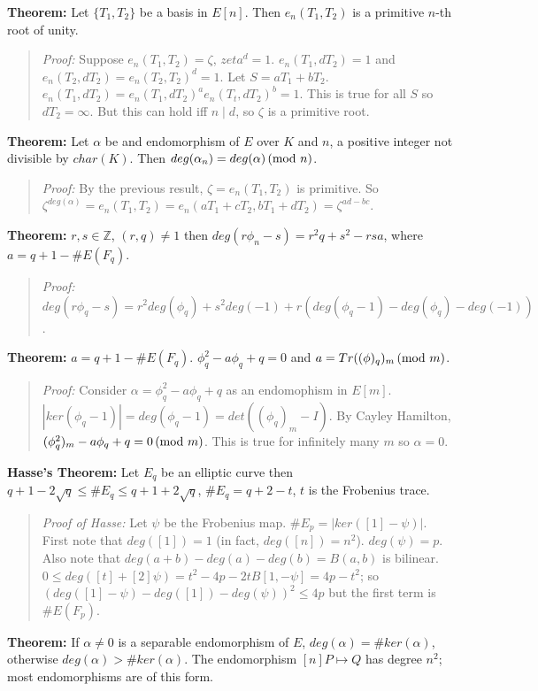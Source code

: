 {\bf Theorem:} Let $\{T_1 , T_2 \}$ be a basis in $E[n]$.  Then $e_n(T_1 , T_2 )$ is a primitive $n$-th
root of unity.
\begin{quote}
\emph{Proof:}  Suppose $e_n(T_1 , T_2 )= \zeta$, $zeta^d=1$.  $e_n(T_1, d T_2)=1$ and
$e_n(T_2, dT_2)= e_n(T_2 , T_2 )^d= 1$.  Let $S= a T_1 +b T_2$.  
$e_n(T_1, dT_2)= e_n(T_1 , dT_2)^a e_n(T_t, dT_2)^b=1$.  This is true for all $S$ so $dT_2= \infty$.  But
this can hold iff $n \mid d$, so $\zeta$ is  a primitive root.
\end{quote}
{\bf Theorem:} Let $\alpha$ be and endomorphism of $E$ over $K$ and $n$, a positive integer
not divisible by $char(K)$.  Then $deg( \alpha_n )= deg( \alpha ) \thinspace \textnormal{(mod } n \textnormal{)}$.
\begin{quote}
\emph{Proof:} By the previous result, $\zeta= e_n(T_1 , T_2 ) $ is primitive. So
$\zeta^{deg( \alpha )}= e_n(T_1 , T_2 )= e_n(aT_1 + c T_2, bT_1 + d T_2)= \zeta^{ad-bc}$.
\end{quote}
{\bf Theorem:} $r, s \in \mathbb{Z}$, $(r,q) \neq 1$ then $deg(r\phi_n-s)= r^2q+s^2- r s a$, where
$a= q+1-\#E(F_q)$.
\begin{quote}
\emph{Proof:} 
$deg(r \phi_q - s)= r^2 deg( \phi_q ) + s^2 deg(-1) + r( deg( \phi_q - 1) -
deg( \phi_q ) - deg(-1))$.
\end{quote}
{\bf Theorem:} $a= q+1-\#E(F_q)$.  $\phi_q^2-a\phi_q +q=0$ and $a=Tr((\phi)_q)_m \thinspace \textnormal{(mod } m \textnormal{)}$.
\begin{quote}
\emph{Proof:}
Consider $\alpha= \phi_q^2 -a \phi_q +q$ as an endomophism in $E[m]$.
$|ker(\phi_q-1)|= deg(\phi_q-1)=det((\phi_q)_m-I)$.  By Cayley Hamilton,
$(\phi_q^2)_m -a \phi_q +q = 0 \thinspace \textnormal{(mod } m \textnormal{)}$.  This is true for infinitely many
$m$ so $\alpha=0$.
\end{quote}
{\bf Hasse's Theorem:} Let $E_q$ be an elliptic curve then 
$ q+1- 2 {\sqrt q} \le \#E_q \le q+1+ 2 {\sqrt q}$,
$\#E_q=q+2-t$, $t$ is the Frobenius trace. 
\begin{quote}
\emph{Proof of Hasse:}
Let $\psi$ be the Frobenius map.  
$\#E_p = |ker([1]-\psi)|$.  First note that $deg([1])=1$ (in fact, $deg([n]) =n^2$).
$deg(\psi)= p$.  Also note that $deg(a+b)-deg(a)-deg(b)=B(a,b)$ is bilinear.
$0 \le deg([t] + [2] \psi)=t^2 -4p -2tB[1, -\psi]= 4p-t^2$; so
$(deg([1]-\psi) - deg([1]) -deg(\psi))^2 \le 4p$ but the first term is $\#E(F_p)$.
\end{quote}
{\bf Theorem:}
If $\alpha \ne 0$ is a separable endomorphism of $E$, 
$deg(\alpha)= \#ker(\alpha)$, otherwise
$deg(\alpha)> \#ker(\alpha)$.  
The endomorphism $[n]P \mapsto Q$ has degree $n^2$; most endomorphisms are of this form.
